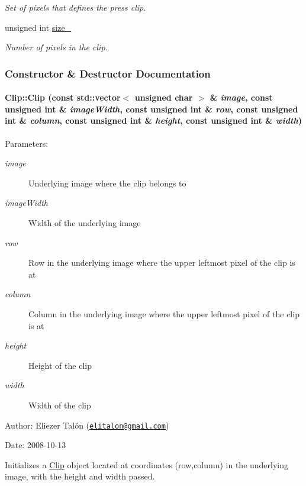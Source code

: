 \begin{CompactItemize}
\begin{CompactList}\small\item\em Set of pixels that defines the press clip. \item\end{CompactList}\item 
\hypertarget{class_clip_b88daf5fdd2b57dec8335ff8fd4a6d4e}{
unsigned int \hyperlink{class_clip_b88daf5fdd2b57dec8335ff8fd4a6d4e}{size\_\-}}
\label{class_clip_b88daf5fdd2b57dec8335ff8fd4a6d4e}

\begin{CompactList}\small\item\em Number of pixels in the clip. \item\end{CompactList}\end{CompactItemize}


\subsubsection{Constructor \& Destructor Documentation}
\hypertarget{class_clip_6264e0334483ad8e0631842a18ac5bc9}{
\paragraph[Clip]{\setlength{\rightskip}{0pt plus 5cm}Clip::Clip (const std::vector$<$ unsigned char $>$ \& {\em image}, \/  const unsigned int \& {\em imageWidth}, \/  const unsigned int \& {\em row}, \/  const unsigned int \& {\em column}, \/  const unsigned int \& {\em height}, \/  const unsigned int \& {\em width})}\hfill}
\label{class_clip_6264e0334483ad8e0631842a18ac5bc9}


\begin{Desc}
\item[Parameters:]
\begin{description}
\item[{\em image}]Underlying image where the clip belongs to \item[{\em imageWidth}]Width of the underlying image \item[{\em row}]Row in the underlying image where the upper leftmost pixel of the clip is at \item[{\em column}]Column in the underlying image where the upper leftmost pixel of the clip is at \item[{\em height}]Height of the clip \item[{\em width}]Width of the clip\end{description}
\end{Desc}
\begin{Desc}
\item[Author:]Eliezer Talón (\href{mailto:elitalon@gmail.com}{\tt elitalon@gmail.com}) \end{Desc}
\begin{Desc}
\item[Date:]2008-10-13\end{Desc}
Initializes a \hyperlink{class_clip}{Clip} object located at coordinates (row,column) in the underlying image, with the height and width passed. 

